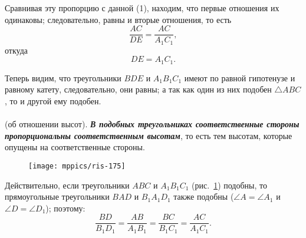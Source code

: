 Сравнивая эту пропорцию с данной (1), находим, что первые отношения их одинаковы;
следовательно, равны и вторые отношения, то есть 
\[\frac{AC}{DE}=\frac{AC}{A_1C_1},\]
откуда
\[DE=A_1C_1.\]

Теперь видим, что треугольники $BDE$ и $A_1B_1C_1$ имеют по равной гипотенузе и равному катету, следовательно, они равны;
а так как один из них подобен $\triangle ABC$, то и другой ему подобен.

\paragraph{}\label{1938/165}
 (об отношении высот).
\textbf{\emph{В подобных треугольниках соответственные стороны пропорциональны соответственным высотам}}, то есть тем высотам, которые опущены на соответственные стороны.

\begin{figure}[h!]
\centering
\texttt{[image: mppics/ris-175]}
\caption{}\label{1938/ris-175}
\end{figure}


Действительно, если треугольники $ABC$ и $A_1B_1C_1$ (рис.~\ref{1938/ris-175}) подобны, то прямоугольные треугольники $BAD$ и $B_1A_1D_1$ также подобны ($\angle A = \angle A_1$ и $\angle D=\angle D_1$);
поэтому:
\[\frac{BD}{B_1D_1}=\frac{AB}{A_1B_1}=\frac{BC}{B_1C_1}=\frac{AC}{A_1C_1}.\]
